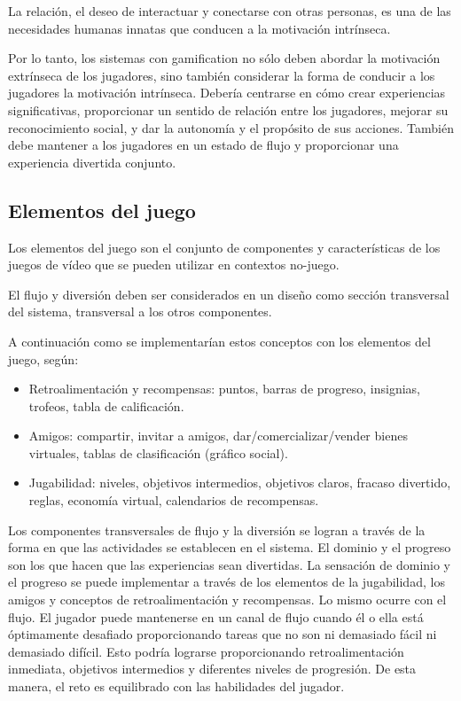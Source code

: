 La relación, el deseo de interactuar y conectarse con otras personas, es una de
las necesidades humanas innatas que conducen a la motivación
intrínseca\cite{framework:gamification}.

Por lo tanto, los sistemas con gamification no sólo deben abordar la motivación
extrínseca de los jugadores, sino también considerar la forma de conducir a los
jugadores la motivación intrínseca. Debería centrarse en cómo crear experiencias
significativas, proporcionar un sentido de relación entre los jugadores, mejorar
su reconocimiento social, y dar la autonomía y el propósito de sus acciones.
También debe mantener a los jugadores en un estado de flujo y proporcionar una
experiencia divertida conjunto\cite{framework:gamification}. 


\subsection{Elementos del juego}

Los elementos del juego son el conjunto de componentes y características de los
juegos de vídeo que se pueden utilizar en contextos
no-juego\cite{framework:gamification}.

El flujo y diversión deben ser considerados en un diseño como sección
transversal del sistema, transversal a los otros
componentes\cite{framework:gamification}.

A continuación  como se implementarían estos conceptos con los elementos
del juego, según\cite{framework:gamification}:

\begin{itemize}
    \item Retroalimentación y recompensas: puntos, barras de progreso,
        insignias, trofeos, tabla de calificación.
    \item Amigos: compartir, invitar a amigos, dar/comercializar/vender bienes
        virtuales, tablas de clasificación (gráfico social).
    \item Jugabilidad: niveles, objetivos intermedios, objetivos claros, fracaso
        divertido, reglas, economía virtual, calendarios de recompensas.
\end{itemize}

Los componentes transversales de flujo y la diversión se logran a través de la
forma en que las actividades se establecen en el sistema. El dominio y el
progreso son los que hacen que las experiencias sean divertidas. La sensación de
dominio y el progreso se puede implementar a través de los elementos de la
jugabilidad, los amigos y conceptos de retroalimentación y recompensas. Lo mismo
ocurre con el flujo. El jugador puede mantenerse en un canal de flujo cuando él
o ella está óptimamente desafiado proporcionando tareas que no son ni demasiado
fácil ni demasiado difícil. Esto podría lograrse proporcionando
retroalimentación inmediata, objetivos intermedios y diferentes niveles de
progresión. De esta manera, el reto es equilibrado con las habilidades del
jugador\cite{framework:gamification}.

